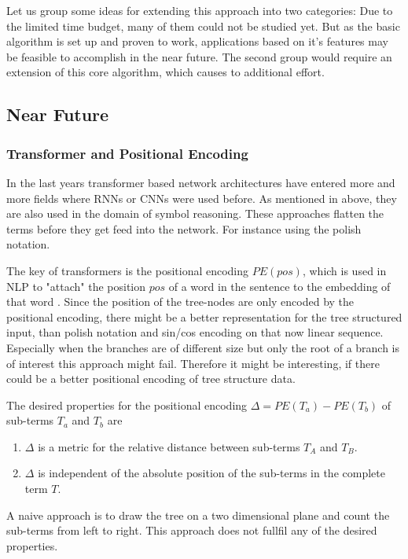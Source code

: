\documentclass{scrartcl}
\theoremstyle{definition}
\begin{document}
Let us group some ideas for extending this approach into two categories:
Due to the limited time budget, many of them could not be studied yet.
But as the basic algorithm is set up and proven to work, applications based on it's features may be feasible to accomplish in the near future.
The second group would require an extension of this core algorithm, which causes to additional effort.

\subsection{Near Future}

\subsubsection{Transformer and Positional Encoding}

In the last years transformer based network architectures have entered more and more fields where RNNs or CNNs were used before.
As mentioned in above, they are also used in the domain of symbol reasoning.
These approaches flatten the terms before they get feed into the network.
For instance using the polish notation.

The key of transformers is the positional encoding $PE\left( pos\right)$, which is used in NLP to "attach" the position $pos$ of a word in the sentence to the embedding of that word \cite{vaswani2017attention}.
Since the position of the tree-nodes are only encoded by the positional encoding, there might be a better representation for the tree structured input,
than polish notation and sin/cos encoding on that now linear sequence.
Especially when the branches are of different size but only the root of a branch is of interest this approach might fail.
Therefore it might be interesting, if there could be a better positional encoding of tree structure data.

The desired properties for the positional encoding $\Delta= PE\left( T_a \right) - PE\left( T_b \right)$ of sub-terms $T_a$ and $T_b$ are
\begin{enumerate}[label=(\roman*)]
	\item $\Delta$ is a metric for the relative distance between sub-terms $T_A$ and $T_B$.
	\item $\Delta$ is independent of the absolute position of the sub-terms in the complete term $T$.
\end{enumerate}

A naive approach is to draw the tree on a two dimensional plane and count the sub-terms from left to right.
This approach does not fullfil any of the desired properties.
\end{document}
